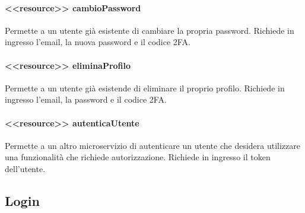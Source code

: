 \documentclass{report}
\begin{document}
\paragraph*{<<resource>> cambioPassword}
Permette a un utente già esistente  di cambiare la propria password.
Richiede in ingresso l'email, la nuova password e il codice 2FA.

\paragraph*{<<resource>> eliminaProfilo}
Permette a un utente già esistende di eliminare il proprio profilo.
Richiede in ingresso l'email, la password e il codice 2FA.

\paragraph*{<<resource>> autenticaUtente}
Permette a un altro microservizio di autenticare un utente che desidera utilizzare una funzionalità che richiede autorizzazione.
Richiede in ingresso il token dell'utente.

\subsection{Login}
\end{document}
